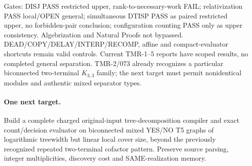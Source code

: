 \documentclass[11pt]{article}
\begin{document}
Gates: DISJ PASS restricted upper, rank-to-necessary-work FAIL; relativization PASS local/OPEN general; simultaneous DTISP PASS as paired restricted upper, no forbidden-pair conclusion; configuration counting PASS only as upper consistency. Algebrization and Natural Proofs not bypassed. DEAD/COPY/DELAY/INTERP/RECOMP, affine and compact-evaluator shortcuts remain valid controls. Current TMR-1--5 reports have scoped results, no completed general separation. TMR-2/073 already recognizes a particular biconnected two-terminal $K_{3,3}$ family; the next target must permit nonidentical modules and authentic mixed separator types.

\paragraph{One next target.}
Build a complete charged original-input tree-decomposition compiler and exact count/decision evaluator on biconnected mixed YES/NO T5 graphs of logarithmic treewidth but linear local cover size, beyond the previously recognized repeated two-terminal cofactor pattern. Preserve source parsing, integer multiplicities, discovery cost and SAME-realization memory.
\end{document}
